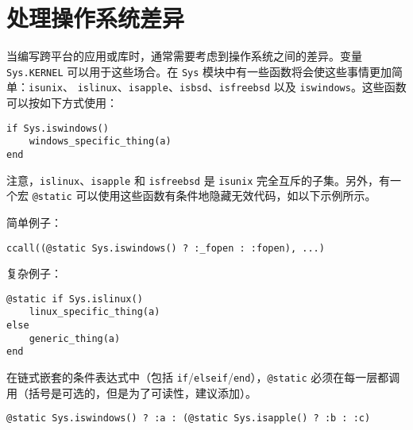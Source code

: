 

\hypertarget{4348488381006315694}{}


\chapter{处理操作系统差异}



当编写跨平台的应用或库时，通常需要考虑到操作系统之间的差异。变量 \texttt{Sys.KERNEL} 可以用于这些场合。在 \texttt{Sys} 模块中有一些函数将会使这些事情更加简单：\texttt{isunix}、 \texttt{islinux}、\texttt{isapple}、\texttt{isbsd}、\texttt{isfreebsd} 以及 \texttt{iswindows}。这些函数可以按如下方式使用：




\begin{verbatim}
if Sys.iswindows()
    windows_specific_thing(a)
end
\end{verbatim}



注意，\texttt{islinux}、\texttt{isapple} 和 \texttt{isfreebsd} 是 \texttt{isunix} 完全互斥的子集。另外，有一个宏 \texttt{@static} 可以使用这些函数有条件地隐藏无效代码，如以下示例所示。



简单例子：




\begin{lstlisting}
ccall((@static Sys.iswindows() ? :_fopen : :fopen), ...)
\end{lstlisting}



复杂例子：




\begin{verbatim}
@static if Sys.islinux()
    linux_specific_thing(a)
else
    generic_thing(a)
end
\end{verbatim}



在链式嵌套的条件表达式中（包括 \texttt{if}/\texttt{elseif}/\texttt{end}），\texttt{@static} 必须在每一层都调用（括号是可选的，但是为了可读性，建议添加）。




\begin{verbatim}
@static Sys.iswindows() ? :a : (@static Sys.isapple() ? :b : :c)
\end{verbatim}



